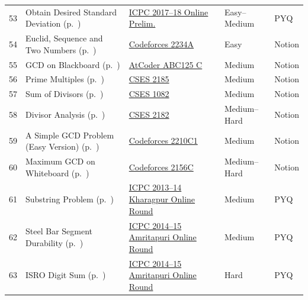 {\begin{longtable}{r >{\raggedright\arraybackslash}p{4.6cm} >{\raggedright\arraybackslash}p{5.6cm} l l}
53 & Obtain Desired Standard Deviation (p.~\pageref{sec:n-stddev}) & \href{https://www.codechef.com/problems/STDDEV}{ICPC 2017--18 Online Prelim.} & Easy--Medium & PYQ\\
54 & Euclid, Sequence and Two Numbers (p.~\pageref{sec:n-euclid-seq}) & \href{https://codeforces.com/problemset/problem/2234/A}{Codeforces 2234A} & Easy & Notion\\
55 & GCD on Blackboard (p.~\pageref{sec:n-gcd-blackboard}) & \href{https://atcoder.jp/contests/abc125/tasks/abc125_c}{AtCoder ABC125 C} & Medium & Notion\\
56 & Prime Multiples (p.~\pageref{sec:n-prime-multiples}) & \href{https://cses.fi/problemset/task/2185}{CSES 2185} & Medium & Notion\\
57 & Sum of Divisors (p.~\pageref{sec:n-sum-div}) & \href{https://cses.fi/problemset/task/1082}{CSES 1082} & Medium & Notion\\
58 & Divisor Analysis (p.~\pageref{sec:n-div-analysis}) & \href{https://cses.fi/problemset/task/2182}{CSES 2182} & Medium--Hard & Notion\\
59 & A Simple GCD Problem (Easy Version) (p.~\pageref{sec:n-simple-gcd}) & \href{https://codeforces.com/problemset/problem/2210/C1}{Codeforces 2210C1} & Medium & Notion\\
60 & Maximum GCD on Whiteboard (p.~\pageref{sec:n-whiteboard}) & \href{https://codeforces.com/problemset/problem/2156/C}{Codeforces 2156C} & Medium--Hard & Notion\\
61 & Substring Problem (p.~\pageref{sec:n-substring}) & \href{https://github.com/m-e-r-l-i-n/icpc-india/blob/main/src/Kharagpur_Site_Online_Problems_2013.pdf}{ICPC 2013--14 Kharagpur Online Round} & Medium & PYQ\\
62 & Steel Bar Segment Durability (p.~\pageref{sec:n-steel-bar}) & \href{https://github.com/m-e-r-l-i-n/icpc-india/blob/main/src/2014amrita_online.pdf}{ICPC 2014--15 Amritapuri Online Round} & Medium & PYQ\\
63 & ISRO Digit Sum (p.~\pageref{sec:n-isro}) & \href{https://github.com/m-e-r-l-i-n/icpc-india/blob/main/src/2014amrita_online.pdf}{ICPC 2014--15 Amritapuri Online Round} & Hard & PYQ\\
\bottomrule
\end{longtable}}
